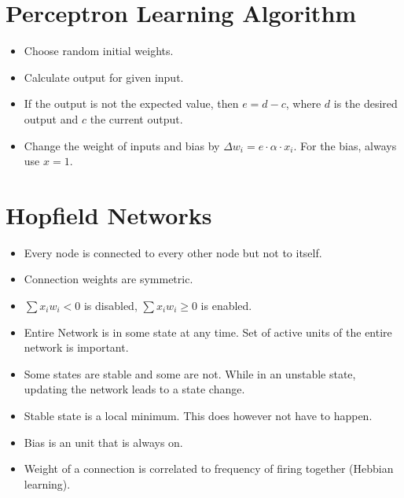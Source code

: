 \documentclass[main]{subfiles}
\begin{document}

\section{Perceptron Learning Algorithm}

\begin{itemize}[noitemsep,nolistsep]
	\item Choose random initial weights.
	\item Calculate output for given input.
	\item If the output is not the expected value, then $e=d-c$, where $d$ is the desired output and $c$ the current output.
	\item Change the weight of inputs and bias by $\Delta w_i=e\cdot\alpha\cdot x_i$. For the bias, always use $x=1$.
\end{itemize}

\section{Hopfield Networks}

\begin{itemize}[noitemsep,nolistsep]
	\item Every node is connected to every other node but not to itself.
	\item Connection weights are symmetric.
	\item $\sum x_iw_i < 0$ is disabled, $\sum x_iw_i \geq 0$ is enabled.
	\item Entire Network is in some state at any time. Set of active units of the entire network is important.
	\item Some states are stable and some are not. While in an unstable state, updating the network leads to a state change.
	\item Stable state is a local minimum. This does however not have to happen.
	\item Bias is an unit that is always on.
	\item Weight of a connection is correlated to frequency of firing together (Hebbian learning).
\end{itemize}
\end{document}
